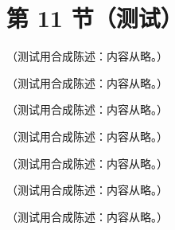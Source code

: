 \section{第 11 节（测试）}\label{sec:appO-neighbours}

\begin{remark}[测量相容性的统一判据]\label{rem:appO-measurement}
（测试用合成陈述：内容从略。）
\end{remark}

\begin{remark}[$pp\to h_1h_2X$ 在 (O-3) 失效]\label{rem:appO-hh}
（测试用合成陈述：内容从略。）
\end{remark}

\begin{remark}[快度间隙与衍射]\label{rem:appO-gaps}
（测试用合成陈述：内容从略。）
\end{remark}

\begin{remark}\label{rem:appO-dft}
（测试用合成陈述：内容从略。）
\end{remark}

\begin{remark}\label{rem:appO-double-dy}
（测试用合成陈述：内容从略。）
\end{remark}

\begin{remark}\label{rem:appO-rs-dictionary}
（测试用合成陈述：内容从略。）
\end{remark}

\begin{remark}\label{rem:appO-literature-comparison}
（测试用合成陈述：内容从略。）
\end{remark}

